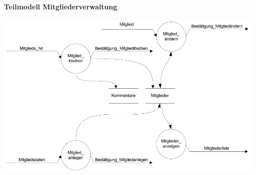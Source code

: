 \paragraph{Teilmodell Mitgliederverwaltung}
\includegraphics[scale=0.85]{teilmodell_mitgliederverwaltung}
\newpage

